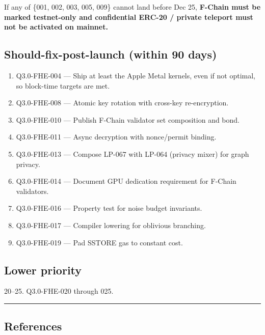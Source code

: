 \documentclass[
]{article}
\providecommand{\tightlist}{%
  \setlength{\itemsep}{0pt}\setlength{\parskip}{0pt}}
\begin{document}
If any of \{001, 002, 003, 005, 009\} cannot land before Dec 25,
\textbf{F-Chain must be marked testnet-only and confidential ERC-20 /
private teleport must not be activated on mainnet.}

\subsection{Should-fix-post-launch (within 90
days)}\label{should-fix-post-launch-within-90-days}

\begin{enumerate}
\def\labelenumi{\arabic{enumi}.}
\setcounter{enumi}{10}
\tightlist
\item
  Q3.0-FHE-004 --- Ship at least the Apple Metal kernels, even if not
  optimal, so block-time targets are met.
\item
  Q3.0-FHE-008 --- Atomic key rotation with cross-key re-encryption.
\item
  Q3.0-FHE-010 --- Publish F-Chain validator set composition and bond.
\item
  Q3.0-FHE-011 --- Async decryption with nonce/permit binding.
\item
  Q3.0-FHE-013 --- Compose LP-067 with LP-064 (privacy mixer) for graph
  privacy.
\item
  Q3.0-FHE-014 --- Document GPU dedication requirement for F-Chain
  validators.
\item
  Q3.0-FHE-016 --- Property test for noise budget invariants.
\item
  Q3.0-FHE-017 --- Compiler lowering for oblivious branching.
\item
  Q3.0-FHE-019 --- Pad SSTORE gas to constant cost.
\end{enumerate}

\subsection{Lower priority}\label{lower-priority}

20--25. Q3.0-FHE-020 through 025.

\begin{center}\rule{0.5\linewidth}{0.5pt}\end{center}

\subsection{References}\label{references}
\end{document}
